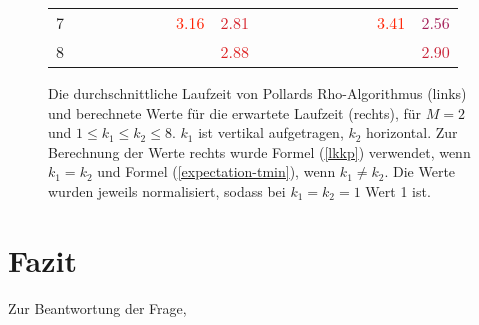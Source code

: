 \documentclass[a4paper, 10pt, ngerman]{article}
\begin{document}
\begin{figure}
\begin{tabular}{c|p{\colwidth}p{\colwidth}p{\colwidth}p{\colwidth}p{\colwidth}p{\colwidth}p{\colwidth}p{\colwidth}c|p{\colwidth}p{\colwidth}p{\colwidth}p{\colwidth}p{\colwidth}p{\colwidth}p{\colwidth}p{\colwidth}}
        7 &                                   &                                    &                                    &                                    &                                    &                                    & \textcolor[HTML]{ ff2000 }{ 3.16 } & \textcolor[HTML]{ d52029 }{ 2.81 } & \space &                                    &                                    &                                    &                                    &                                    &                                    & \textcolor[HTML]{ ff2000 }{ 3.41 } & \textcolor[HTML]{ a4205a }{ 2.56 } \\
        8 &                                   &                                    &                                    &                                    &                                    &                                    &                                    & \textcolor[HTML]{ dd2021 }{ 2.88 } & \space &                                    &                                    &                                    &                                    &                                    &                                    &                                    & \textcolor[HTML]{ c82036 }{ 2.90 } \\
    \end{tabular}

    \caption{Die durchschnittliche Laufzeit von Pollards Rho-Algorithmus (links) und berechnete Werte für die erwartete Laufzeit (rechts), für $M = 2$ und $1 \le k_1 \le k_2 \le 8$. $k_1$ ist vertikal aufgetragen, $k_2$ horizontal. Zur Berechnung der Werte rechts wurde Formel (\ref{lkkp}) verwendet, wenn $k_1 = k_2$ und Formel (\ref{expectation-tmin}), wenn $k_1 \ne k_2$. Die Werte wurden jeweils normalisiert, sodass bei $k_1 = k_2 = 1$ Wert 1 ist.}
    \label{fig:measurements-m2}
\end{figure}

\section{Fazit}

Zur Beantwortung der Frage,

\printbibliography
\end{document}
